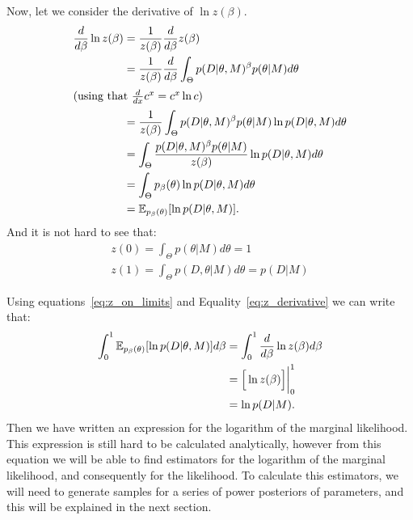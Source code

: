 Now, let we consider the derivative of $\ln z(\beta)$.
\begin{align}
    \frac{d}{d\beta} \ln z(\beta) &= \frac{1}{z(\beta)}  
        \frac{d}{d\beta} z(\beta) \notag\\
    &= \frac{1}{z(\beta)} \frac{d}{d\beta} 
        \int_\Theta p (D | \theta, M)^\beta p(\theta | M) d\theta \notag\\
    \shortintertext{(using that $\frac{d}{dx} c^x = c^x \ln c$)}
    &= \frac{1}{z(\beta)} \int_\Theta p (D | \theta, M)^\beta 
        p(\theta | M) \ln p(D|\theta, M)d\theta \notag\\
    &= \int_\Theta \frac{p (D | \theta, M)^\beta p(\theta | M)}
                        {z(\beta)}
                    \ln p(D| \theta, M)d\theta \notag\\
    &=\int_\Theta p_\beta (\theta) \ln p (D | \theta, M)d\theta \notag\\ 
    &=\mathbb{E}_{p_\beta (\theta)} [\ln p(D|\theta, M)]. \label{eq:z_derivative}
\end{align}
And it is not hard to see that:
\begin{equation}
\begin{gathered}
    z (0) = \int_\Theta p (\theta | M)d\theta = 1 \\
    z (1) = \int_\Theta p (D, \theta | M)d\theta = p (D|M) 
    \label{eq:z_on_limits}
\end{gathered}
\end{equation}

Using equations~\ref{eq:z_on_limits} and Equality~\ref{eq:z_derivative}
we can write that:
\begin{align}
    \int_0^1 \mathbb{E}_{p_\beta (\theta)} [\ln p(D|\theta, M)]d\beta 
    &= \int_0^1 \frac{d}{d\beta} \ln z(\beta) d\beta \notag \\
    &= \Big[\ln z(\beta)\Big]\bigg\rvert^1_0 \notag \\
    &= \ln p (D | M).
    \label{eq:thermodynamic_integral}
\end{align}
Then we have written an expression for the logarithm of the marginal
likelihood. This expression is still hard to be calculated analytically,
however from this equation we will be able to find estimators for
the logarithm of the marginal likelihood, and consequently for the
likelihood. To calculate this estimators, we will need to generate 
samples for a series of power posteriors of parameters, and this will
be explained in the next section.


